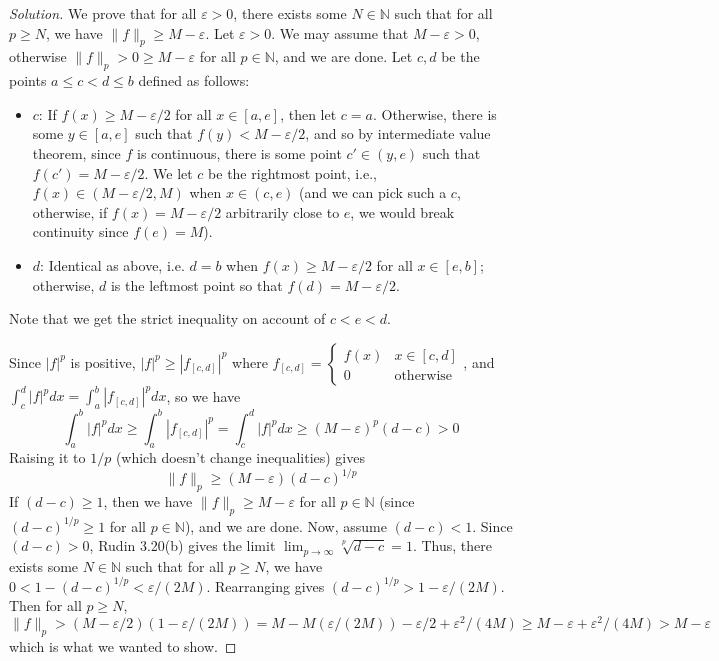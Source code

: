 \documentclass{article}
\newcommand{\N}{{\mathbb N}}
\newcommand{\ep}{{\varepsilon}}
\theoremstyle{remark}
\begin{document}
\begin{enumerate}
\begin{proof}[Solution]
		We prove that for all $\ep > 0$, there exists some $N \in \N$
		such that for all $p \geq N$, we have $\lVert f \rVert_p \geq M - \ep$.
		Let $\ep > 0$.
		We may assume that $M - \ep > 0$,
		otherwise $\lVert f \rVert_p > 0 \geq M - \ep$ for all $p\in\N$, and we are done.
		Let $c,d$ be the points $a \leq c < d \leq b$
		defined as follows:
		\begin{itemize}
			\item $c$: If $f(x) \geq M - \ep/2$ for all $x \in [a,e]$,
				then let $c = a$.
				Otherwise, there is some $y \in [a,e]$ such that
				$f(y) < M - \ep/2$, and so by intermediate value theorem,
				since $f$ is continuous,
				there is some point $c' \in (y,e)$ such that $f(c') = M - \ep/2$.
				We let $c$ be the rightmost point, i.e.,
				$f(x) \in (M - \ep/2, M)$ when $x \in (c,e)$
				(and we can pick such a $c$,
				otherwise, if $f(x) = M - \ep/2$ arbitrarily close to $e$,
				we would break continuity since $f(e) = M$).
			\item $d$: Identical as above,
				i.e. $d = b$ when $f(x) \geq M - \ep/2$ for all $x \in [e,b]$;
				otherwise, $d$ is the leftmost point so that $f(d) = M - \ep/2$.
		\end{itemize}
		Note that we get the strict inequality on account of $c < e < d$.

		Since $|f|^p$ is positive, $|f|^p \geq |f_{[c,d]}|^p$
		where $f_{[c,d]} =
		\begin{cases} f(x) & x \in [c,d]\\ 0 & \text{otherwise}\end{cases}$,
		and $\int_c^d |f|^pdx = \int_a^b |f_{[c,d]}|^pdx$, so we have
		\[
			\int_a^b |f|^pdx \geq \int_a^b |f_{[c,d]}|^p =
			\int_c^d |f|^pdx \geq (M - \ep)^p(d - c) > 0
		\]
		Raising it to $1/p$ (which doesn't change inequalities) gives
		\[
			\lVert f \rVert_p \geq (M-\ep)(d-c)^{1/p}
		\]
		If $(d-c) \geq 1$, then we have $\lVert f \rVert_p \geq M - \ep$
		for all $p \in \N$
		(since $(d-c)^{1/p} \geq 1$ for all $p \in \N$),
		and we are done.
		Now, assume $(d-c) < 1$.
		Since $(d-c) > 0$, Rudin 3.20(b) gives the limit
		$\lim_{p\to\infty} \sqrt[p]{d-c} = 1$.
		Thus, there exists some $N \in \N$ such that for all $p \geq N$,
		we have $0 < 1 - (d-c)^{1/p} < \ep/(2M)$.
		Rearranging gives $(d-c)^{1/p} > 1 - \ep/(2M)$.
		Then for all $p \geq N$,
		\[
			\lVert f \rVert_p > (M - \ep/2)(1 - \ep/(2M)) =
			M -M(\ep/(2M)) - \ep/2 + \ep^2/(4M)
			\geq M - \ep + \ep^2/(4M)
			> M - \ep
		\]
		which is what we wanted to show.


\end{proof}
\end{enumerate}
\end{document}
